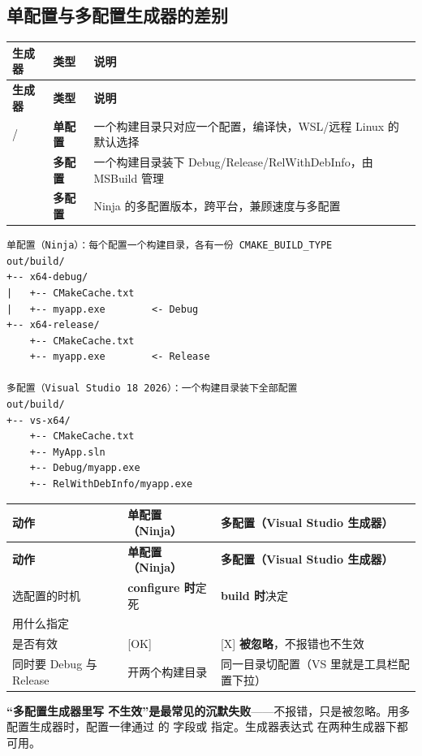 \subsection{单配置与多配置生成器的差别}
\begin{longtable}{L{4.4cm}L{2.2cm}L{8.0cm}}
\toprule \textbf{生成器} & \textbf{类型} & \textbf{说明} \\ \midrule
\endfirsthead
\toprule \textbf{生成器} & \textbf{类型} & \textbf{说明} \\ \midrule
\endhead
\bottomrule \endlastfoot
{} /  & \textbf{单配置} & 一个构建目录只对应一个配置，编译快，WSL/远程 Linux 的默认选择 \\
 & \textbf{多配置} & 一个构建目录装下 Debug/Release/RelWithDebInfo，由 MSBuild 管理 \\
\allowbreak{} & \textbf{多配置} & Ninja 的多配置版本，跨平台，兼顾速度与多配置 \\
\end{longtable}
\begin{lstlisting}[style=textstyle]
单配置（Ninja）：每个配置一个构建目录，各有一份 CMAKE_BUILD_TYPE
out/build/
+-- x64-debug/
|   +-- CMakeCache.txt
|   +-- myapp.exe        <- Debug
+-- x64-release/
    +-- CMakeCache.txt
    +-- myapp.exe        <- Release

多配置（Visual Studio 18 2026）：一个构建目录装下全部配置
out/build/
+-- vs-x64/
    +-- CMakeCache.txt
    +-- MyApp.sln
    +-- Debug/myapp.exe
    +-- RelWithDebInfo/myapp.exe
\end{lstlisting}

\begin{longtable}{L{3.4cm}L{5.8cm}L{5.4cm}}
\toprule \textbf{动作} & \textbf{单配置（Ninja）} & \textbf{多配置（Visual Studio 生成器）} \\ \midrule
\endfirsthead
\toprule \textbf{动作} & \textbf{单配置（Ninja）} & \textbf{多配置（Visual Studio 生成器）} \\ \midrule
\endhead
\bottomrule \endlastfoot
选配置的时机 & \textbf{configure 时}定死 & \textbf{build 时}决定 \\
用什么指定 & \allowbreak{} &  \\
 是否有效 & [OK] & [X] \textbf{被忽略}，不报错也不生效 \\
同时要 Debug 与 Release & 开两个构建目录 & 同一目录切配置（VS 里就是工具栏配置下拉） \\
\end{longtable}
\begin{warnbox}[注意]
\textbf{“多配置生成器里写  不生效”是最常见的沉默失败}——不报错，只是被忽略。用多配置生成器时，配置一律通过  的  字段或  指定。生成器表达式  在两种生成器下都可用。
\end{warnbox}

